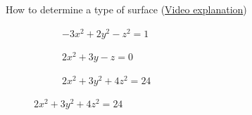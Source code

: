 \documentclass[aspectratio=169]{beamer}
\begin{document}
\begin{frame}[t]{How to determine a type of surface (\href{https://youtu.be/aM-0-oAppp0}{Video explanation})}
\begin{figure}[H]
    \begin{subfigure}[t]{0.32\textwidth}
        \caption{$-3x^2+2y^2-z^2=1$ \\ }
        \label{fig:1_4.png}
    \end{subfigure}
    \begin{subfigure}[t]{0.32\textwidth}
        \caption{$2x^2+3y-z=0$ \\ }
        \label{fig:1_5.png}
    \end{subfigure}
    \begin{subfigure}[t]{0.32\textwidth}
        \caption{$2x^2+3y^2+4z^2=24$ \\ }
        \label{fig:1_6.png}
    \end{subfigure}
\end{figure}
\end{frame}
\end{document}
